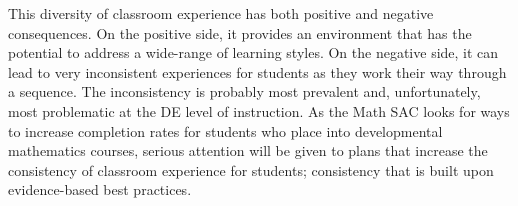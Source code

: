 This diversity of classroom experience has both positive and negative consequences.
On the positive side, it provides an environment that has the potential to address a wide-range of learning styles.
On the negative side, it can lead to very inconsistent experiences for students as they work their way through a sequence.
The inconsistency is probably most prevalent and, unfortunately, most  problematic at the DE level of instruction.
As the Math SAC looks for ways to increase completion rates for students who place into developmental mathematics courses, serious attention will be given to plans that increase the consistency of classroom experience for students; consistency that is built upon evidence-based best practices.

